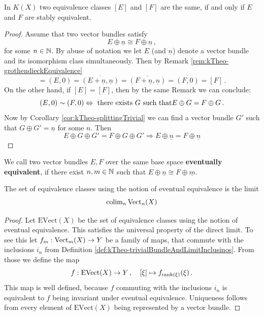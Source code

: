\begin{lemma}
	In $K(X)$ two equivalence classes $[E]$ and $[F]$ are the same, if and only if $E$ and $F$ are stably equivalent.
\end{lemma}
\begin{proof}
	Assume that two vector bundles satisfy
	\begin{equation*}
		E\oplus \underline{n}\cong F\oplus \underline{n}\,,
	\end{equation*} for some $n\in \mathbb{N}$. By abuse of notation we let $E$ (and $\underline{n}$) denote a vector bundle and its isomorphism class simultaneously. Then by Remark \ref{rem:kTheo-grothendieckEquivalence}
	\begin{equation*}
		[E]=\overline{(E,0)}=\overline{(E+\underline{n},\underline{n})}=\overline{(F+\underline{n},\underline{n})}=\overline{(F,0)}=[F]\,.
	\end{equation*}
	On the other hand, if $[E]=[F]$, then by the same Remark we can conclude:
	\begin{equation*}
		(E,0)\sim (F,0)\\
		\Leftrightarrow \text{ there exists } G \text{ such that} E\oplus G=F\oplus G \,.
	\end{equation*} Now by Corollary \ref{cor:kTheo-splittingTrivial} we can find a vector bundle $G'$ such that $G\oplus G'=\underline{n}$ for some $n$. Then
	\begin{equation*}
		E\oplus G\oplus G'=F\oplus G \oplus G' \Rightarrow E\oplus \underline{n}=F\oplus \underline{n}
	\end{equation*}
\end{proof}
\begin{definition}
	We call two vector bundles $E,F$ over the same base space \textbf{eventually equivalent}, if there exist $n,m\in \mathbb{N}$ such that $E\oplus \underline{n}\cong F\oplus \underline{m}$.
\end{definition}
\begin{lemma}
	The set of equivalence classes using the notion of eventual equivalence is the limit 
	\begin{equation*}
		\operatorname{\mathrm{colim}}_n \operatorname{\mathrm{Vect}}_n(X)
	\end{equation*}
\end{lemma}
\begin{proof}Let $\mathrm{EVect}(X)$ be the set of equivalence classes using the notion of eventual equivalence. This satisfies the universal property of the direct limit. To see this let $f_m:\operatorname{\mathrm{Vect}}_m(X)\to Y$ be a family of maps, that commute with the inclusions $i_n$ from Definition \ref{def:kTheo-trivialBundleAndLimitInclusinos}. From those we define the map 
	\begin{equation*}
		f: \mathrm{EVect}(X) \to Y\,, \quad [\xi] \mapsto f_{\operatorname{\mathrm{rank}}(\xi)}(\xi)\,.
	\end{equation*} This map is well defined, because $f$ commuting with the inclusions $i_n$ is equivalent to $f$ being invariant under eventual equivalence. Uniqueness follows from every element of $\mathrm{EVect}(X)$ being represented by a vector bundle.
\end{proof}
